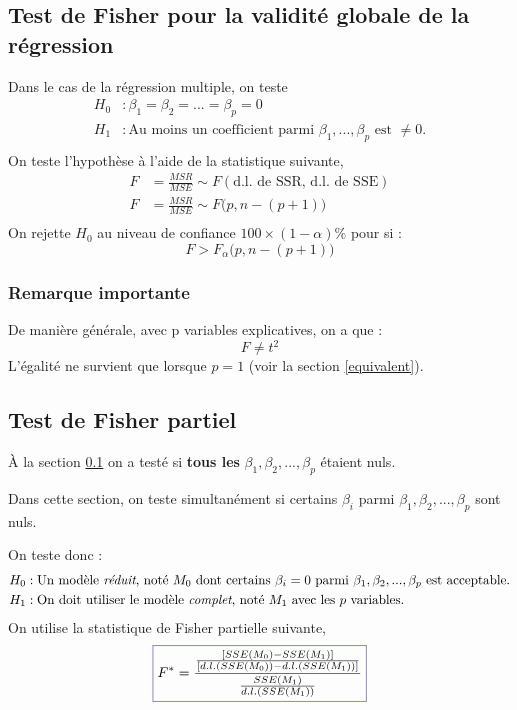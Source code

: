\documentclass[11pt,french]{report}
\begin{document}
\subsection{Test de Fisher pour la validité globale de la régression}
\label{sec:fisherT}
Dans le cas de la régression multiple, on teste 
\begin{align*}
H_0 &: \beta_1 = \beta_2 = ... = \beta_p = 0 \\
H_1 &: \text{Au moins un coefficient parmi $\beta_1,...,\beta_p$ est $\neq 0$.} \\
\end{align*}
On teste l'hypothèse à l'aide de la statistique suivante, \\
\begin{align*}
F &= \frac{MSR}{MSE} \sim F(\text{d.l. de SSR, d.l. de SSE}) \\
F &= \frac{MSR}{MSE} \sim F\big(p, n - (p+1)\big) \\
\end{align*}
On rejette $H_0$ au niveau de confiance $100 \times (1 - \alpha)\%$ pour si :
$$
F > F_{\alpha}\big(p, n-(p+1)\big)
$$

\subsubsection*{Remarque importante}
De manière générale, avec p variables explicatives, on a que :
$$
F \neq t^2
$$
L'égalité ne survient que lorsque $p=1$ (voir la section \ref{equivalent}).

\subsection{Test de Fisher partiel}
\label{sec:testFpartiel}
À la section \ref{sec:fisherT} on a testé si \textbf{tous les} $\beta_1, \beta_2,...,\beta_p$ étaient nuls. \newline

Dans cette section, on teste simultanément si certains $\beta_i$ parmi $\beta_1, \beta_2,...,\beta_p$ sont nuls.

On teste donc :
\begin{align*}
H_0 &: \text{Un modèle \emph{réduit}, noté $M_0$ dont certains $\beta_i =0$ parmi $\beta_1, \beta_2,...,\beta_p$ est acceptable.} \\
H_1 &: \text{On doit utiliser le modèle \emph{complet}, noté $M_1$ avec les $p$ variables.} \\
\end{align*}
On utilise la statistique de Fisher partielle suivante,
\begin{equation}
\label{eq:fisherpartiel}
\color{Blue}
\boxed{\color{black}
F^* = \displaystyle{\frac{\frac{[SSE(M_0) - SSE(M_1)]}{[d.l.(SSE(M_0)) - d.l.(SSE(M_1))]}}{\frac{SSE(M_1)}{d.l.(SSE(M_1))}}
}}
\end{equation}
\end{document}
